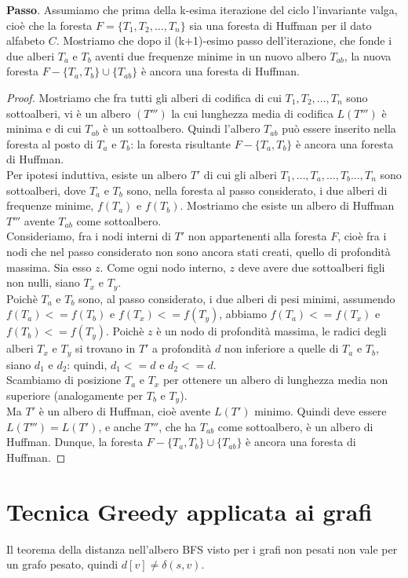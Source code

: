 \documentclass[11pt]{article}
\begin{document}
\textbf{Passo}. Assumiamo che prima della k-esima iterazione del ciclo l'invariante valga, cioè che la foresta 
$F=\{T_1,T_2,\dots,T_n\}$ sia una foresta di Huffman per il dato alfabeto $C$. Mostriamo che dopo il (k+1)-esimo passo 
dell'iterazione, che fonde i due alberi $T_a$ e $T_b$ aventi due frequenze minime in un nuovo albero $T_{ab}$, la nuova 
foresta $F-\{T_a,T_b\}\cup\{T_{ab}\}$ è ancora una foresta di Huffman.
\begin{proof}
    Mostriamo che fra tutti gli alberi di codifica di cui $T_1,T_2,\dots,T_n$ sono sottoalberi, vi è un albero $(T''')$ 
    la cui lunghezza media di codifica $L(T''')$ è minima e di cui $T_{ab}$ è un sottoalbero. Quindi l'albero $T_{ab}$ può 
    essere inserito nella foresta al posto di $T_a$ e $T_b$: la foresta risultante $F-\{T_a,T_b\}$ è ancora una foresta 
    di Huffman.\\
    Per ipotesi induttiva, esiste un albero $T'$ di cui gli alberi $T_1,\dots,T_a,\dots,T_b\dots,T_n$ sono sottoalberi, 
    dove $T_a$ e $T_b$ sono, nella foresta al passo considerato, i due alberi di frequenze minime, $f(T_a)$ e $f(T_b)$. 
    Mostriamo che esiste un albero di Huffman $T'''$ avente $T_{ab}$ come sottoalbero.\\
    Consideriamo, fra i nodi interni di $T'$ non appartenenti alla foresta $F$, cioè fra i nodi che nel passo considerato 
    non sono ancora stati creati, quello di profondità massima. Sia esso $z$. Come ogni nodo interno, $z$ deve avere due 
    sottoalberi figli non nulli, siano $T_x$ e $T_y$.\\
    Poichè $T_a$ e $T_b$ sono, al passo considerato, i due alberi di pesi minimi, assumendo $f(T_a)<=f(T_b)$ e $f(T_x)<=f(T_y)$,
    abbiamo $f(T_a)<=f(T_x)$ e $f(T_b)<=f(T_y)$. Poichè $z$ è un nodo di profondità massima, le radici degli alberi $T_x$ 
    e $T_y$ si trovano in $T'$ a profondità $d$ non inferiore a quelle di $T_a$ e $T_b$, siano $d_1$ e $d_2$: quindi, 
    $d_1<=d$ e $d_2<=d$.\\
    Scambiamo di posizione $T_a$ e $T_x$ per ottenere un albero di lunghezza media non superiore (analogamente per $T_b$
    e $T_y$).\\
    Ma $T'$ è un albero di Huffman, cioè avente $L(T')$ minimo. Quindi deve essere $L(T''')=L(T')$, e anche $T'''$, che 
    ha $T_{ab}$ come sottoalbero, è un albero di Huffman. Dunque, la foresta $F-\{T_a,T_b\}\cup\{T_{ab}\}$ è ancora una 
    foresta di Huffman.
\end{proof}
\section{Tecnica Greedy applicata ai grafi}
Il teorema della distanza nell'albero BFS visto per i grafi non pesati non vale per un grafo pesato, quindi $d[v]\neq\delta(s,v)$.
\end{document}
